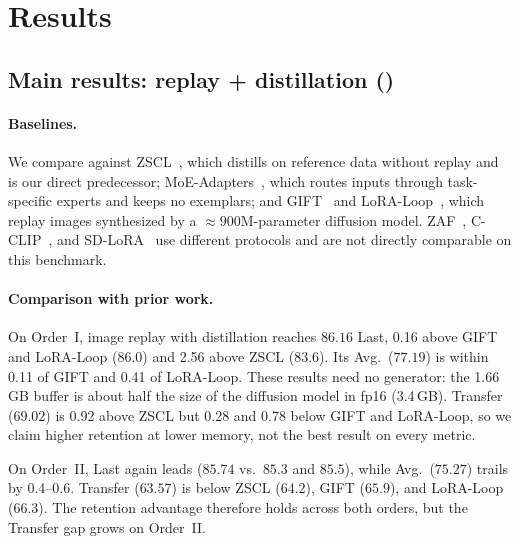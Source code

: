 \providecommand{\CHECK}[1]{\textcolor{orange}{#1}}

\section{Results}
\label{sec:results}

\subsection{Main results: replay + distillation ()}
\label{sec:res-q1}

\paragraph{Baselines.}
We compare against ZSCL~\cite{zheng2023zscl}, which distills on reference data
without replay and is our direct predecessor; MoE-Adapters~\cite{yu2024moe},
which routes inputs through task-specific experts and keeps no exemplars; and
GIFT~\cite{gift2025} and LoRA-Loop~\cite{loraloop2025}, which replay images
synthesized by a ${\approx}900$M-parameter diffusion model. ZAF~\cite{gao2024zaf},
C-CLIP~\cite{liu2025cclip}, and SD-LoRA~\cite{wu2025sdlora} use different
protocols and are not directly comparable on this benchmark.

\paragraph{Comparison with prior work.}
On Order~I, image replay with distillation reaches $86.16$ Last, 0.16 above
GIFT and LoRA-Loop (86.0) and 2.56 above ZSCL (83.6). Its Avg.\
($77.19$) is within 0.11 of GIFT and 0.41 of LoRA-Loop. These results need
no generator: the 1.66\,GB buffer is about half the size of the diffusion model
in fp16 (3.4\,GB). Transfer ($69.02$) is 0.92 above ZSCL but 0.28 and 0.78
below GIFT and LoRA-Loop, so we claim higher retention at lower memory, not the
best result on every metric.

On Order~II, Last again leads ($85.74$ vs.\ $85.3$ and $85.5$), while Avg.\
($75.27$) trails by 0.4--0.6. Transfer ($63.57$) is below ZSCL ($64.2$), GIFT
($65.9$), and LoRA-Loop ($66.3$). The retention advantage therefore holds across
both orders, but the Transfer gap grows on Order~II.

